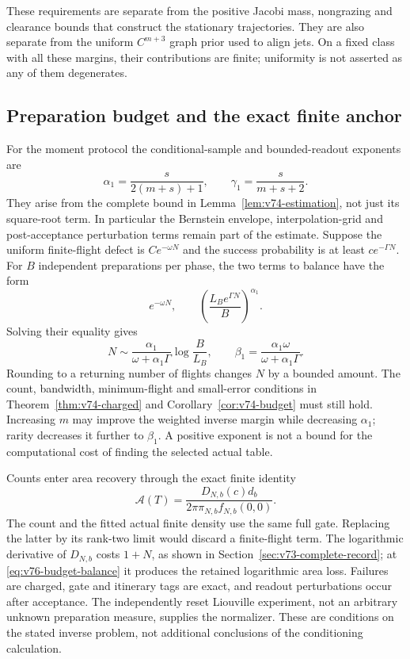 These requirements are separate from the positive Jacobi mass,
nongrazing and clearance bounds that construct the stationary trajectories.
They are also separate from the uniform $C^{m+3}$ graph prior used to
align jets.  On a fixed class with all these margins, their contributions
are finite; uniformity is not asserted as any of them degenerates.

\subsection{Preparation budget and the exact finite anchor}

For the moment protocol the conditional-sample and bounded-readout
exponents are
\[
 \alpha_1=\frac{s}{2(m+s)+1},\qquad
 \gamma_1=\frac{s}{m+s+2}.
\]
They arise from the complete bound in
Lemma~\ref{lem:v74-estimation}, not just its square-root term.
In particular the Bernstein envelope, interpolation-grid and
post-acceptance perturbation terms remain part of the estimate.
Suppose the uniform finite-flight defect is $Ce^{-\omega N}$ and
the success probability is at least $c e^{-\Gamma N}$.
For $B$ independent preparations per phase, the two terms to balance
have the form
\[
 e^{-\omega N},\qquad
 \left(\frac{L_Be^{\Gamma N}}B\right)^{\alpha_1}.
\]
Solving their equality gives
\begin{equation}\label{eq:v76-budget-balance}
 N\sim\frac{\alpha_1}{\omega+\alpha_1\Gamma}
                      \log\frac{B}{L_B},\qquad
 \beta_1=\frac{\alpha_1\omega}{\omega+\alpha_1\Gamma}.
\end{equation}
Rounding to a returning number of flights changes $N$ by a bounded
amount.  The count, bandwidth, minimum-flight and small-error conditions
in Theorem~\ref{thm:v74-charged} and
Corollary~\ref{cor:v74-budget} must still hold.  Increasing $m$ may
improve the weighted inverse margin while decreasing $\alpha_1$;
rarity decreases it further to $\beta_1$.  A positive exponent is not
a bound for the computational cost of finding the selected actual table.

Counts enter area recovery through the exact finite identity
\[
 \mathcal A(T)=\frac{D_{N,b}(c)d_b}
                    {2\pi\pi_{N,b}f_{N,b}(0,0)}.
\]
The count and the fitted actual finite density use the same full gate.
Replacing the latter by its rank-two limit would discard a finite-flight
term.  The logarithmic derivative of $D_{N,b}$ costs $1+N$, as shown
in Section~\ref{sec:v73-complete-record}; at
\eqref{eq:v76-budget-balance} it produces the retained logarithmic area
loss.  Failures are charged, gate and itinerary tags are exact, and
readout perturbations occur after acceptance.  The independently reset
Liouville experiment, not an arbitrary unknown preparation measure,
supplies the normalizer.  These are conditions on the stated inverse
problem, not additional conclusions of the conditioning calculation.
